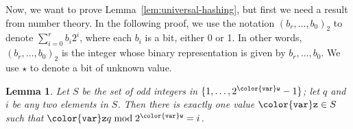 \documentclass[10pt]{book}
\theoremstyle{plain}
\newtheorem{lem}{Lemma}[chapter]
\newcommand{\lemlabel}[1]{\label{lem:#1}}
\newcommand{\lemref}[1]{Lemma~\ref{lem:#1}}
\theoremstyle{definition}
\begin{document}
Now, we want to prove \lemref{universal-hashing}, but first we need a
result from number theory.  In the following proof, we use the notation
$(b_r,\ldots,b_0)_2$ to denote $\sum_{i=0}^r b_i2^i$, where each $b_i$
is a bit, either 0 or 1.  In other words, $(b_r,\ldots,b_0)_2$ is
the integer whose binary representation is given by $b_r,\ldots,b_0$.
We use $\star$ to denote a bit of unknown value.

\begin{lem}\lemlabel{hashing-mapping}
  Let $S$ be the set of odd integers in $\{1,\ldots,2^{\ensuremath{\mathtt{{\color{var}w}}}}-1\}$; let $q$
  and $i$ be any two elements in $S$.  Then there is exactly one value
  $\ensuremath{\mathtt{{\color{var}z}}}\in S$ such that $\ensuremath{\mathtt{{\color{var}z}}}q\bmod 2^{\ensuremath{\mathtt{{\color{var}w}}}} = i$.
\end{lem}
\end{document}
